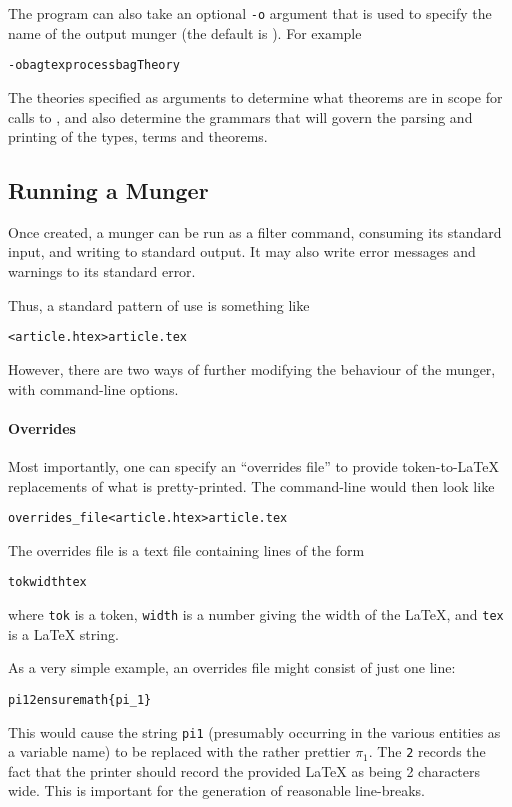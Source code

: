 The \mkmunge{} program can also take an optional \texttt{-o} argument that is used to specify the name of the output munger (the default is \munge).  For example
\begin{alltt}
   \mkmunge -o bagtexprocess bagTheory
\end{alltt}

The theories specified as arguments to \mkmunge{} determine what theorems are in scope for calls to \holthm, and also determine the grammars that will govern the parsing and printing of the \HOL{} types, terms and theorems.


\subsection{Running a Munger}
\label{sec:running-munger}

Once created, a munger can be run as a filter command, consuming its
standard input, and writing to standard output.
%
It may also write error messages and warnings to its standard error.

Thus, a standard pattern of use is something like
\begin{alltt}
   \munge < article.htex > article.tex
\end{alltt}

However, there are two ways of further modifying the behaviour of the
munger, with command-line options.

\paragraph{Overrides}
Most importantly, one can specify an ``overrides file'' to provide
token-to-\LaTeX{} replacements of what is pretty-printed.
%
The command-line would then look like
\begin{alltt}
   \munge overrides_file < article.htex > article.tex
\end{alltt}
The overrides file is a text file containing lines of the form
\begin{alltt}
   tok width tex
\end{alltt}
where \texttt{tok} is a \HOL{} token, \texttt{width} is a number
giving the width of the \LaTeX{}, and \texttt{tex} is a \LaTeX{}
string.

As a very simple example, an overrides file might consist of just one
line:
\begin{alltt}
   pi1 2 \bs{}ensuremath\{\bs{}pi_1\}
\end{alltt}
This would cause the string \texttt{pi1} (presumably occurring in the
various \HOL{} entities as a variable name) to be replaced with the
rather prettier $\pi_1$.
%
The \texttt{2} records the fact that the
printer should record the provided \LaTeX{} as being 2 characters
wide.
%
This is important for the generation of reasonable line-breaks.

